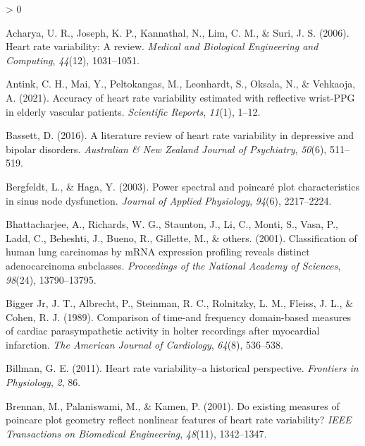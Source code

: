 \documentclass[
  english,
  jou,floatsintext]{apa6}
\newlength{\cslhangindent}
\newenvironment{CSLReferences}[2] %
 {%
  \setlength{\parindent}{0pt}
  \ifodd #1 \everypar{\setlength{\hangindent}{\cslhangindent}}\ignorespaces\fi
  \ifnum #2 > 0
  \setlength{\parskip}{#2\baselineskip}
  \fi
 }%
 {}
\begin{document}
\hypertarget{refs}{}
\begin{CSLReferences}{1}{0}
\leavevmode\hypertarget{ref-acharya2006heart}{}%
Acharya, U. R., Joseph, K. P., Kannathal, N., Lim, C. M., \& Suri, J. S. (2006). Heart rate variability: A review. \emph{Medical and Biological Engineering and Computing}, \emph{44}(12), 1031--1051.

\leavevmode\hypertarget{ref-antink2021accuracy}{}%
Antink, C. H., Mai, Y., Peltokangas, M., Leonhardt, S., Oksala, N., \& Vehkaoja, A. (2021). Accuracy of heart rate variability estimated with reflective wrist-PPG in elderly vascular patients. \emph{Scientific Reports}, \emph{11}(1), 1--12.

\leavevmode\hypertarget{ref-bassett2016literature}{}%
Bassett, D. (2016). A literature review of heart rate variability in depressive and bipolar disorders. \emph{Australian \& New Zealand Journal of Psychiatry}, \emph{50}(6), 511--519.

\leavevmode\hypertarget{ref-bergfeldt2003power}{}%
Bergfeldt, L., \& Haga, Y. (2003). Power spectral and poincar{é} plot characteristics in sinus node dysfunction. \emph{Journal of Applied Physiology}, \emph{94}(6), 2217--2224.

\leavevmode\hypertarget{ref-bhattacharjee2001classification}{}%
Bhattacharjee, A., Richards, W. G., Staunton, J., Li, C., Monti, S., Vasa, P., Ladd, C., Beheshti, J., Bueno, R., Gillette, M., \& others. (2001). Classification of human lung carcinomas by mRNA expression profiling reveals distinct adenocarcinoma subclasses. \emph{Proceedings of the National Academy of Sciences}, \emph{98}(24), 13790--13795.

\leavevmode\hypertarget{ref-bigger1989comparison}{}%
Bigger Jr, J. T., Albrecht, P., Steinman, R. C., Rolnitzky, L. M., Fleiss, J. L., \& Cohen, R. J. (1989). Comparison of time-and frequency domain-based measures of cardiac parasympathetic activity in holter recordings after myocardial infarction. \emph{The American Journal of Cardiology}, \emph{64}(8), 536--538.

\leavevmode\hypertarget{ref-billman2011heart}{}%
Billman, G. E. (2011). Heart rate variability--a historical perspective. \emph{Frontiers in Physiology}, \emph{2}, 86.

\leavevmode\hypertarget{ref-brennan2001existing}{}%
Brennan, M., Palaniswami, M., \& Kamen, P. (2001). Do existing measures of poincare plot geometry reflect nonlinear features of heart rate variability? \emph{IEEE Transactions on Biomedical Engineering}, \emph{48}(11), 1342--1347.


\end{CSLReferences}
\end{document}
